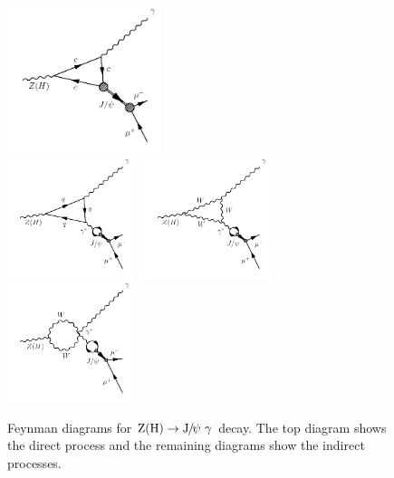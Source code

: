 \begin{figure}[!ht]\begin{center}
\includegraphics[width=0.4\textwidth]{Fig/ZJpsiG_direct_v2}\\
\includegraphics[width=0.33\textwidth]{Fig/ZJpsiG_Indirect1_v2}~
\includegraphics[width=0.33\textwidth]{Fig/ZJpsiG_Indirect2_v2}~
\includegraphics[width=0.33\textwidth]{Fig/ZJpsiG_Indirect3_v2}\\
\caption{Feynman diagrams for $\mathrm{Z}(\mathrm{H})\to{\mathrm{J}\hspace{-.08em}/\hspace{-.14em}\psi}\ \gamma$ decay. The top diagram shows the direct process and the remaining diagrams show the indirect processes.}
\label{fig:ZJpsiG_diag}\end{center}\end{figure}

